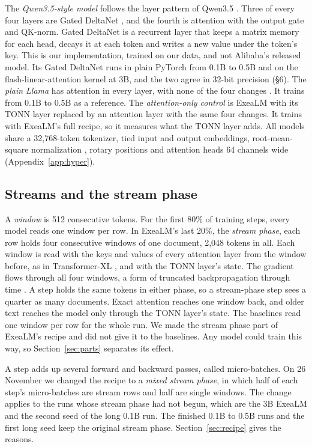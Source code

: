 \documentclass[10pt,twocolumn,letterpaper]{article}
\newcommand{\sect}[1]{\S#1}
\begin{document}
The \emph{Qwen3.5-style model} follows the layer pattern of Qwen3.5 \citep{qwen35}.
Three of every four layers are Gated DeltaNet \citep{yang2025gated}, and the fourth is attention with the output gate and QK-norm.
Gated DeltaNet is a recurrent layer that keeps a matrix memory for each head, decays it at each token and writes a new value under the token's key.
This is our implementation, trained on our data, and not Alibaba's released model.
Its Gated DeltaNet runs in plain PyTorch from 0.1B to 0.5B and on the flash-linear-attention kernel \citep{yang2024fla} at 3B, and the two agree in 32-bit precision (\sect{6}).
The \emph{plain Llama} has attention in every layer, with none of the four changes \citep{touvron2023llama}.
It trains from 0.1B to 0.5B as a reference.
The \emph{attention-only control} is ExeaLM with its TONN layer replaced by an attention layer with the same four changes.
It trains with ExeaLM's full recipe, so it measures what the TONN layer adds.
All models share a 32,768-token tokenizer, tied input and output embeddings, root-mean-square normalization \citep{zhang2019rmsnorm}, rotary positions \citep{su2024roformer} and attention heads 64 channels wide (Appendix~\ref{app:hyper}).

\subsection{Streams and the stream phase}
\label{sec:streams}

A \emph{window} is 512 consecutive tokens.
For the first 80\% of training steps, every model reads one window per row.
In ExeaLM's last 20\%, the \emph{stream phase}, each row holds four consecutive windows of one document, 2,048 tokens in all.
Each window is read with the keys and values of every attention layer from the window before, as in Transformer-XL \citep{dai2019transformerxl}, and with the TONN layer's state.
The gradient flows through all four windows, a form of truncated backpropagation through time \citep{williams1990tbptt}.
A step holds the same tokens in either phase, so a stream-phase step sees a quarter as many documents.
Exact attention reaches one window back, and older text reaches the model only through the TONN layer's state.
The baselines read one window per row for the whole run.
We made the stream phase part of ExeaLM's recipe and did not give it to the baselines.
Any model could train this way, so Section~\ref{sec:parts} separates its effect.

A step adds up several forward and backward passes, called micro-batches.
On 26 November we changed the recipe to a \emph{mixed stream phase}, in which half of each step's micro-batches are stream rows and half are single windows.
The change applies to the runs whose stream phase had not begun, which are the 3B ExeaLM and the second seed of the long 0.1B run.
The finished 0.1B to 0.5B runs and the first long seed keep the original stream phase.
Section~\ref{sec:recipe} gives the reasons.
\end{document}
